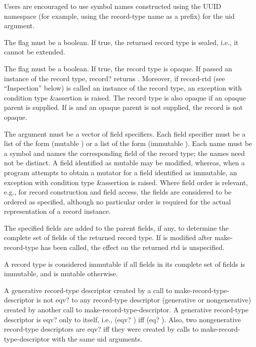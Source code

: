 \begin{entry}{%
}
\begin{note}   
  Users are encouraged to use symbol names
  constructed using the UUID namespace (for example, using the
  record-type name as a prefix) for the uid argument.
\end{note}

The  flag must be a boolean. If true, the returned record type
is sealed, i.e., it cannot be extended.

The  flag must be a boolean. If true, the record type
is opaque.
If passed an instance of the record type,
{\cf record?} returns
\schfalse{}.  Moreover, if {\cf record-rtd} (see ``Inspection'' below)
is called an instance of the record type, 
an exception with condition type {\cf\&assertion} is raised.
The record type is also opaque if an opaque parent is
supplied.  If  is \schfalse{} and an opaque parent is not
supplied, the record is not opaque.

The  argument must be a vector of field specifiers. Each
field specifier must be a list of the form {\cf (mutable )}
or a list of the form {\cf (immutable )}.
Each name must be a symbol and names the corresponding field of the record
type; the names need not be distinct.  A field identified as mutable may
be modified, whereas, when a program attempts to obtain a mutator for a field identified
as immutable, an exception with condition type {\cf\&assertion} is raised.
Where field order is relevant, e.g., for record construction and field
access, the fields are considered to be ordered as specified, although
no particular order is required for the actual representation of a
record instance.

The specified fields are added to the parent fields, if any, to determine
the complete set of fields of the returned record type.
If  is modified after {\cf make-record-type}
has been called, the effect on the returned
rtd is unspecified.

A record type is considered immutable if all fields
in its complete set of fields is immutable, and is mutable otherwise.

A generative record-type descriptor created by a call to {\cf
  make-record-type-descriptor} is not {\cf eqv?} to any record-type
descriptor (generative or nongenerative) created by another call to
{\cf make-record-type-descriptor}. A generative record-type descriptor
is {\cf eqv?}  only to itself, i.e., {\cf (eqv?  )} iff
{\cf (eq?  )}.
Also, two nongenerative record-type descriptors are {\cf eqv?} iff they were
created by calls to {\cf make-record-type-descriptor} with the same
uid arguments.
\end{entry}

